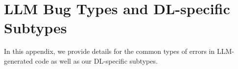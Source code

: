 


\section{LLM Bug Types and DL-specific Subtypes}

In this appendix, we provide details for the common types of errors in LLM-generated code as well as our DL-specific subtypes.

